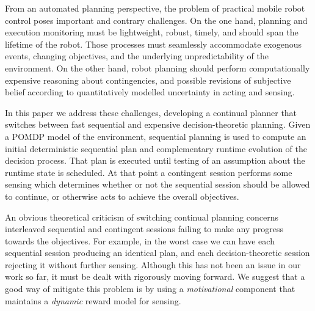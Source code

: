 

From an automated planning perspective, the problem of practical
mobile robot control poses important and contrary challenges.
On the one hand, planning and execution monitoring must be
lightweight, robust, timely, and should span the lifetime of the
robot. Those processes must seamlessly accommodate exogenous events,
changing objectives, and the underlying unpredictability of the
environment.
On the other hand, robot planning should perform computationally
expensive reasoning about contingencies, and possible revisions of
subjective belief according to quantitatively modelled uncertainty in
acting and sensing. 

In this paper we address these challenges, developing a continual
planner that switches between fast sequential and expensive
decision-theoretic planning. Given a POMDP model of the environment,
sequential planning is used to compute an initial deterministic
sequential plan and complementary runtime evolution of the decision
process. That plan is executed until testing of an assumption about
the runtime state is scheduled. At that point a contingent session
performs some sensing which determines whether or not the sequential
session should be allowed to continue, or otherwise acts to achieve
the overall objectives.


An obvious theoretical criticism of switching continual planning
concerns interleaved sequential and contingent sessions failing to
make any progress towards the objectives. For example, in the worst
case we can have each sequential session producing an identical plan,
and each decision-theoretic session rejecting it without further
sensing. Although this has not been an issue in our work so far, it
must be dealt with rigorously moving forward. We suggest that a good
way of mitigate this problem is by using a {\em motivational}
component that maintains a {\em dynamic} reward model for sensing.












